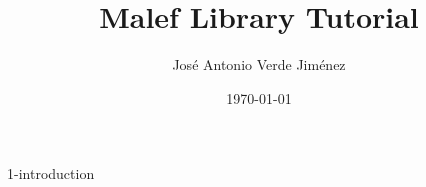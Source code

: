 \documentclass [12pt,a4paper] {article}
\author {José Antonio Verde Jiménez}
\date {\today}
\title {Malef Library Tutorial}
\begin{document}
   \maketitle
   \newpage
   \tableofcontents
   \newpage
   \setcounter{page}{2}

    {1-introduction}
\end{document}
